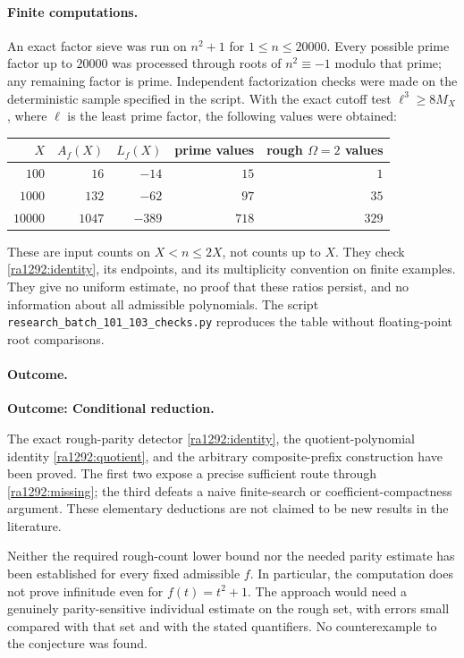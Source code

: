 \documentclass[11pt]{article}
\begin{document}
\paragraph{Finite computations.}
An exact factor sieve was run on $n^2+1$ for $1\le n\le20000$. Every possible
prime factor up to $20000$ was processed through roots of $n^2\equiv-1$
modulo that prime; any remaining factor is prime. Independent factorization
checks were made on the deterministic sample specified in the script.
With the exact cutoff test $\ell^3\ge8M_X$, where $\ell$ is the least prime
factor, the following values were obtained:
\begin{center}
\begin{tabular}{r|r r|r r}
$X$ & $A_f(X)$ & $L_f(X)$ & prime values & rough $\Omega=2$ values\\
\hline
$100$   & $16$   & $-14$  & $15$  & $1$\\
$1000$  & $132$  & $-62$  & $97$  & $35$\\
$10000$ & $1047$ & $-389$ & $718$ & $329$
\end{tabular}
\end{center}
These are input counts on $X<n\le2X$, not counts up to $X$.
They check \eqref{ra1292:identity}, its endpoints, and its multiplicity
convention on finite examples. They give no uniform estimate, no proof that
these ratios persist, and no information about all admissible polynomials.
The script \texttt{research\_batch\_101\_103\_checks.py} reproduces the table
without floating-point root comparisons.

\paragraph{Outcome.}
\textbf{Outcome: Conditional reduction.}

The exact rough-parity detector \eqref{ra1292:identity}, the quotient-polynomial
identity \eqref{ra1292:quotient}, and the arbitrary composite-prefix construction
have been proved. The first two expose a precise sufficient route through
\eqref{ra1292:missing}; the third defeats a naive finite-search or
coefficient-compactness argument. These elementary deductions are not claimed
to be new results in the literature.

Neither the required rough-count lower bound nor the needed parity estimate
has been established for every fixed admissible $f$. In particular, the
computation does not prove infinitude even for $f(t)=t^2+1$. The approach
would need a genuinely parity-sensitive individual estimate on the rough
set, with errors small compared with that set and with the stated quantifiers.
No counterexample to the conjecture was found.
\end{document}
